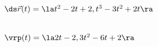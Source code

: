 {$\ds \vec r(t) = \la t^2-2t+2,t^3-3t^2+2t\ra$
}
{
\begin{minipage}{\linewidth}
\\
$\vrp(t) = \la 2t-2,3t^2-6t+2\ra$
\end{minipage}
}

